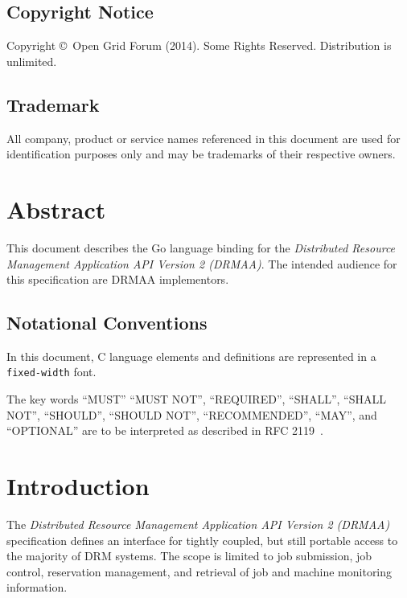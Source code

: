 \documentclass{article}
\newcommand{\copyrightyears}{2014}
\newcommand{\h}[1]{\texttt{#1}}
\begin{document}
\subsection*{Copyright Notice}

Copyright \copyright \ Open Grid Forum (\copyrightyears).  Some Rights Reserved.  
Distribution is unlimited.\\

\subsection*{Trademark}

All company, product or service names referenced in this document are used for identification purposes only and may be trademarks of their respective owners. \\

\section*{Abstract}

This document describes the Go language binding for the \emph{Distributed Resource Management Application API Version 2 (DRMAA)}. The intended audience for this specification are DRMAA implementors. \\

\newpage

\subsection*{Notational Conventions}
\label{sec:rfc2119}

In this document, C language elements and definitions are represented in a \h{fixed-width} font. 

The key words \enquote{MUST} \enquote{MUST NOT}, \enquote{REQUIRED}, \enquote{SHALL}, \enquote{SHALL NOT}, \enquote{SHOULD}, \enquote{SHOULD NOT}, \enquote{RECOMMENDED}, \enquote{MAY},  and \enquote{OPTIONAL} are to be interpreted as described in RFC 2119~\cite{rfc2119}. 

\newpage
\tableofcontents
\newpage

\section{Introduction}
\label{sec:introduction}

 The \emph{Distributed Resource Management Application API Version 2 (DRMAA)} specification defines an interface for tightly coupled, but still portable access to the majority of DRM systems. The scope is limited to job submission, job control, reservation management, and retrieval of job and machine monitoring information. 
\end{document}
